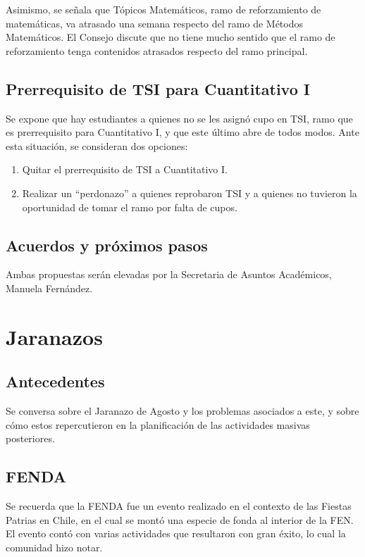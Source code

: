 \documentclass[12pt,letterpaper]{article}
\begin{document}
Asimismo, se señala que Tópicos Matemáticos, ramo de reforzamiento de matemáticas, va atrasado una semana respecto del ramo de Métodos Matemáticos. El Consejo discute que no tiene mucho sentido que el ramo de reforzamiento tenga contenidos atrasados respecto del ramo principal.

\subsection{Prerrequisito de TSI para Cuantitativo I}

Se expone que hay estudiantes a quienes no se les asignó cupo en TSI, ramo que es prerrequisito para Cuantitativo I, y que este último abre de todos modos. Ante esta situación, se consideran dos opciones:

\begin{enumerate}
  \item Quitar el prerrequisito de TSI a Cuantitativo I.
  \item Realizar un ``perdonazo'' a quienes reprobaron TSI y a quienes no tuvieron la oportunidad de tomar el ramo por falta de cupos.
\end{enumerate}

\subsection{Acuerdos y próximos pasos}

Ambas propuestas serán elevadas por la Secretaria de Asuntos Académicos, Manuela Fernández.

\section{Jaranazos}

\subsection{Antecedentes}

Se conversa sobre el Jaranazo de Agosto y los problemas asociados a este, y sobre cómo estos repercutieron en la planificación de las actividades masivas posteriores.

\subsection{FENDA}

Se recuerda que la FENDA fue un evento realizado en el contexto de las Fiestas Patrias en Chile, en el cual se montó una especie de fonda al interior de la FEN. El evento contó con varias actividades que resultaron con gran éxito, lo cual la comunidad hizo notar.
\end{document}
